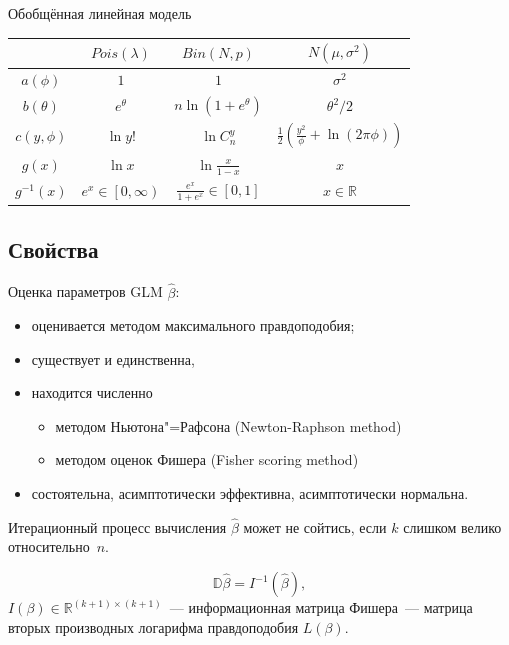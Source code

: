 \documentclass[9pt,pdf,utf8,hyperref={unicode},aspectratio=169]{beamer}
\begin{document}
\begin{frame}{Обобщённая линейная модель}
{    \begin{center}
    \begin{tabular}{|c|c|c|c|}
        \hline
                               & $Pois\left(\lambda\right)$ & $Bin\left(N,p\right)$          & $N\left(\mu,\sigma^2\right)$ \\\hline
        $a\left(\phi\right)$   & $1$                        & $1$                            & $\sigma^2$ \\
        $b\left(\theta\right)$ & $e^\theta$                 & $n\ln\left(1+e^\theta\right)$ & $\theta^2/2$ \\
        $c\left(y,\phi\right)$ & $\ln y!$                  & $\ln C_n^y$                   & $\frac1{2} \left(\frac{y^2}{\phi} + \ln \left(2\pi\phi\right)\right)$\\
		$g\left(x\right)$      & $\ln x$                   & $\ln\frac{x}{1-x}$            & $x$ \\
		$g^{-1}\left(x\right)$ & $e^x \in \left[0,\infty\right)$ & $\frac{e^x}{1+e^x} \in \left[0,1\right]$ & $x \in \mathbb{R}$ \\\hline
    \end{tabular}
    \end{center}    
    }
\end{frame}

\subsection{Свойства}
\begin{frame}{Оценка параметров GLM}
	$\hat{\beta}$:
        \begin{itemize}
	        \item оценивается методом максимального правдоподобия;
        	\item существует и единственна,
        	\item находится численно 
        	\begin{itemize}
        		\item методом Ньютона"=Рафсона (Newton-Raphson method)
        		\item методом оценок Фишера (Fisher scoring method)
        	\end{itemize}
        	\item состоятельна, асимптотически эффективна, асимптотически нормальна.
        \end{itemize}
    Итерационный процесс вычисления $\hat{\beta}$ может не сойтись, если $k$ слишком велико относительно~$n$.
     
    \bigskip
        
    $$\mathbb{D}\hat{\beta} = I^{-1}\left(\hat{\beta}\right),$$
    $I\left(\beta\right) \in \mathbb{R}^{\left(k+1\right)\times\left(k+1\right)}$~--- информационная матрица Фишера~--- матрица вторых производных логарифма правдоподобия  $L\left(\beta\right)$.       
\end{frame}
\end{document}
